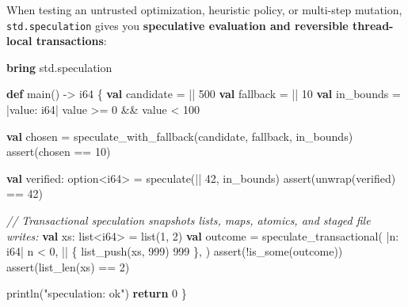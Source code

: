 \documentclass[
  english,
  oneside]{book}
\newenvironment{Shaded}{\begin{snugshade}}{\end{snugshade}}
\newcommand{\CommentTok}[1]{\textcolor[rgb]{0.42,0.60,0.33}{\textit{#1}}}
\newcommand{\ControlFlowTok}[1]{\textcolor[rgb]{0.77,0.53,0.75}{\textbf{#1}}}
\newcommand{\DataTypeTok}[1]{\textcolor[rgb]{0.31,0.79,0.69}{#1}}
\newcommand{\DecValTok}[1]{\textcolor[rgb]{0.71,0.81,0.66}{#1}}
\newcommand{\FunctionTok}[1]{\textcolor[rgb]{0.86,0.86,0.67}{#1}}
\newcommand{\KeywordTok}[1]{\textcolor[rgb]{0.34,0.61,0.84}{\textbf{#1}}}
\newcommand{\NormalTok}[1]{\textcolor[rgb]{0.83,0.83,0.83}{#1}}
\newcommand{\OperatorTok}[1]{\textcolor[rgb]{0.83,0.83,0.83}{#1}}
\newcommand{\StringTok}[1]{\textcolor[rgb]{0.81,0.57,0.47}{#1}}
\begin{document}
When testing an untrusted optimization, heuristic policy, or multi-step
mutation, \texttt{std.speculation} gives you \textbf{speculative
evaluation and reversible thread-local transactions}:

\begin{Shaded}
\begin{Highlighting}[]
\KeywordTok{bring}\NormalTok{ std}\OperatorTok{.}\NormalTok{speculation}

\KeywordTok{def}\NormalTok{ main() }\OperatorTok{{-}\textgreater{}} \DataTypeTok{i64}\NormalTok{ \{}
    \KeywordTok{val}\NormalTok{ candidate }\OperatorTok{=} \OperatorTok{||} \DecValTok{500}
    \KeywordTok{val}\NormalTok{ fallback }\OperatorTok{=} \OperatorTok{||} \DecValTok{10}
    \KeywordTok{val}\NormalTok{ in\_bounds }\OperatorTok{=} \OperatorTok{|}\NormalTok{value: }\DataTypeTok{i64}\OperatorTok{|}\NormalTok{ value }\OperatorTok{\textgreater{}=} \DecValTok{0} \OperatorTok{\&\&}\NormalTok{ value }\OperatorTok{\textless{}} \DecValTok{100}

    \KeywordTok{val}\NormalTok{ chosen }\OperatorTok{=}\NormalTok{ speculate\_with\_fallback(candidate, fallback, in\_bounds)}
    \FunctionTok{assert}\NormalTok{(chosen }\OperatorTok{==} \DecValTok{10}\NormalTok{)}

    \KeywordTok{val}\NormalTok{ verified: }\DataTypeTok{option}\OperatorTok{\textless{}}\DataTypeTok{i64}\OperatorTok{\textgreater{}} \OperatorTok{=}\NormalTok{ speculate(}\OperatorTok{||} \DecValTok{42}\NormalTok{, in\_bounds)}
    \FunctionTok{assert}\NormalTok{(unwrap(verified) }\OperatorTok{==} \DecValTok{42}\NormalTok{)}

    \CommentTok{// Transactional speculation snapshots lists, maps, atomics, and staged file writes:}
    \KeywordTok{val}\NormalTok{ xs: }\DataTypeTok{list}\OperatorTok{\textless{}}\DataTypeTok{i64}\OperatorTok{\textgreater{}} \OperatorTok{=} \DataTypeTok{list}\NormalTok{(}\DecValTok{1}\NormalTok{, }\DecValTok{2}\NormalTok{)}
    \KeywordTok{val}\NormalTok{ outcome }\OperatorTok{=}\NormalTok{ speculate\_transactional(}
        \OperatorTok{|}\NormalTok{n: }\DataTypeTok{i64}\OperatorTok{|}\NormalTok{ n }\OperatorTok{\textless{}} \DecValTok{0}\NormalTok{,}
        \OperatorTok{||}\NormalTok{ \{}
\NormalTok{            list\_push(xs, }\DecValTok{999}\NormalTok{)}
            \DecValTok{999}
\NormalTok{        \},}
\NormalTok{    )}
    \FunctionTok{assert}\NormalTok{(}\OperatorTok{!}\FunctionTok{is\_some}\NormalTok{(outcome))}
    \FunctionTok{assert}\NormalTok{(}\FunctionTok{list\_len}\NormalTok{(xs) }\OperatorTok{==} \DecValTok{2}\NormalTok{)}

\NormalTok{    println(}\StringTok{"speculation: ok"}\NormalTok{)}
    \ControlFlowTok{return} \DecValTok{0}
\NormalTok{\}}
\end{Highlighting}
\end{Shaded}
\end{document}
